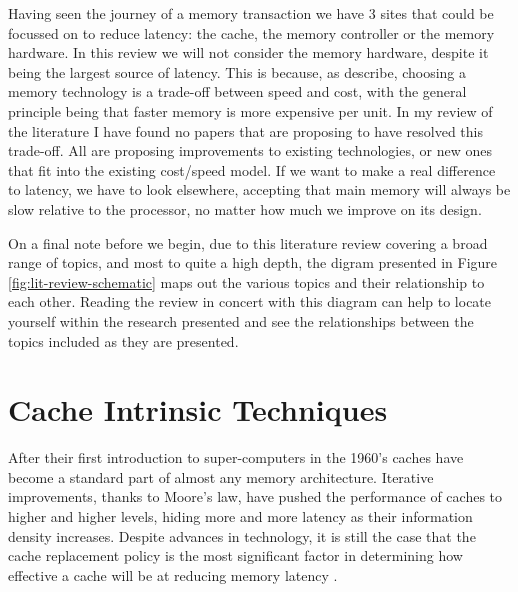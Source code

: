Having seen the journey of a memory transaction we have 3 sites that could be focussed on to reduce latency: the cache, the memory controller or the memory hardware. In this review we will not consider the memory hardware, despite it being the largest source of latency. This is because, as \citet{pattersonComputerOrganizationDesign2018} describe, choosing a memory technology is a trade-off between speed and cost, with the general principle being that faster memory is more expensive per unit. In my review of the literature I have found no papers that are proposing to have resolved this trade-off. All are proposing improvements to existing technologies, or new ones that fit into the existing cost/speed model. If we want to make a real difference to latency, we have to look elsewhere, accepting that main memory will always be slow relative to the processor, no matter how much we improve on its design.

On a final note before we begin, due to this literature review covering a broad range of topics, and most to quite a high depth, the digram presented in Figure \ref{fig:lit-review-schematic} maps out the various topics and their relationship to each other. Reading the review in concert with this diagram can help to locate yourself within the research presented and see the relationships between the topics included as they are presented.

\begin{sidewaysfigure}
	
	\caption[Literature Review Structure]{The structure of the Literature Review showing the topics and subtopics covered, organised into sections. The review is conducted via a depth-first search of these topics.}
	\label{fig:lit-review-schematic}
\end{sidewaysfigure}

\section{Cache Intrinsic Techniques}

\label{sec:cache}

After their first introduction to super-computers in the 1960's \cite{pattersonComputerOrganizationDesign2018} caches have become a standard part of almost any memory architecture. Iterative improvements, thanks to Moore's law, have pushed the performance of caches to higher and higher levels, hiding more and more latency as their information density increases. Despite advances in technology, it is still the case that the cache replacement policy is the most significant factor in determining how effective a cache will be at reducing memory latency \cite{hennessyComputerArchitectureQuantitative2019}.

